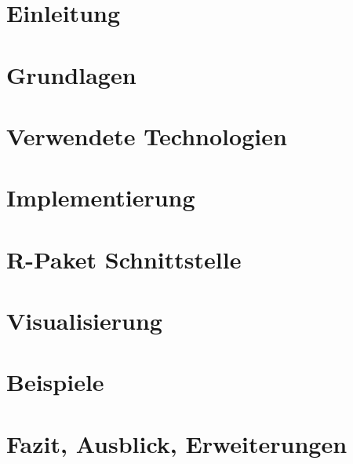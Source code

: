 \chapter{Einleitung}
\label{cha:introduction}


\chapter{Grundlagen}
\label{cha:basics}


\chapter{Verwendete Technologien}
\label{cha:technologies}


\chapter{Implementierung}
\label{cha:implementation}


\chapter{R-Paket Schnittstelle}
\label{cha:interface}


\chapter{Visualisierung}
\label{cha:visualization}


\chapter{Beispiele}
\label{cha:examples}


\chapter{Fazit, Ausblick, Erweiterungen}
\label{cha:result}

